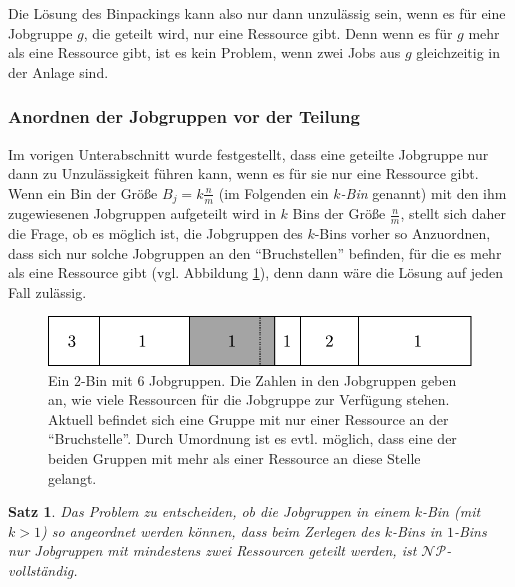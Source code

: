 \documentclass{scrreprt}
\newtheorem{satz}{Satz}
\begin{document}
Die Lösung des Binpackings kann also nur dann unzulässig sein, wenn es für eine Jobgruppe $g$, die geteilt wird, nur eine Ressource gibt.
Denn wenn es für $g$ mehr als eine Ressource gibt, ist es kein Problem, wenn zwei Jobs aus $g$ gleichzeitig in der Anlage sind.

\subsubsection{Anordnen der Jobgruppen vor der Teilung}
Im vorigen Unterabschnitt wurde festgestellt, dass eine geteilte Jobgruppe nur dann
zu Unzulässigkeit führen kann, wenn es für sie nur eine Ressource gibt.
Wenn ein Bin der Größe $B_j = k\frac{n}{m}$ (im Folgenden ein $k$\textit{-Bin} genannt) 
mit den ihm zugewiesenen Jobgruppen aufgeteilt wird in $k$ Bins der Größe $\frac{n}{m}$, 
stellt sich daher die Frage, ob es möglich ist, die Jobgruppen des $k$-Bins vorher so Anzuordnen, dass sich nur solche Jobgruppen an den "`Bruchstellen"' befinden, 
für die es mehr als eine Ressource gibt (vgl. Abbildung \ref{abb:resnp}), denn dann wäre die Lösung auf jeden Fall zulässig.
\begin{figure}
    \begin{center}
        \includegraphics[width=.8\textwidth]{graphics/resnp.pdf}
    \end{center}
    \caption{
        \label{abb:resnp}
        Ein $2$-Bin mit $6$ Jobgruppen. Die Zahlen in den Jobgruppen geben an, wie viele Ressourcen für die Jobgruppe zur Verfügung stehen.
        Aktuell befindet sich eine Gruppe mit nur einer Ressource an der "`Bruchstelle"'.
        Durch Umordnung ist es evtl. möglich, dass eine der beiden Gruppen mit mehr als einer Ressource an diese Stelle gelangt.
    }
\end{figure}
\begin{satz}
    Das Problem zu entscheiden, ob die Jobgruppen in einem $k$-Bin (mit $k>1$) so angeordnet werden können,
    dass beim Zerlegen des $k$-Bins in $1$-Bins nur Jobgruppen mit mindestens zwei Ressourcen geteilt werden, ist $\mathcal{NP}$-vollständig.
\end{satz}
\end{document}

